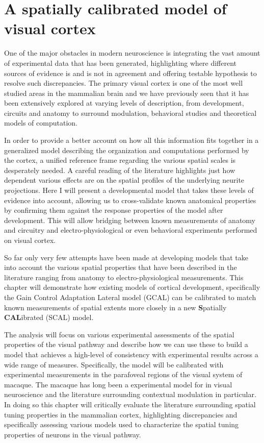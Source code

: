 \chapter{A spatially calibrated model of visual cortex}

One of the major obstacles in modern neuroscience is integrating the
vast amount of experimental data that has been generated, highlighting
where different sources of evidence is and is not in agreement and
offering testable hypothesis to resolve such discrepancies. The
primary visual cortex is one of the most well studied areas in the
mammalian brain and we have previously seen that it has been
extensively explored at varying levels of description, from
development, circuits and anatomy to surround modulation, behavioral
studies and theoretical models of computation.

In order to provide a better account on how all this information fits
together in a generalized model describing the organization and
computations performed by the cortex, a unified reference frame
regarding the various spatial scales is desperately needed. A careful
reading of the literature highlights just how dependent various
effects are on the spatial profiles of the underlying neurite
projections. Here I will present a developmental model that takes
these levels of evidence into account, allowing us to cross-validate
known anatomical properties by confirming them against the response
properties of the model after development. This will allow bridging
between known measurements of anatomy and circuitry and
electro-physiological or even behavioral experiments performed on
visual cortex.

So far only very few attempts have been made at developing models that
take into account the various spatial properties that have been
described in the literature ranging from anatomy to
electro-physiological measurements. This chapter will demonstrate how
existing models of cortical development, specifically the Gain Control
Adaptation Lateral model (GCAL) \citep{Stevens2013} can be calibrated
to match known measurements of spatial extents more closely in a new
\textbf{S}patially \textbf{CAL}ibrated (SCAL) model.

The analysis will focus on various experimental assessments of the
spatial properties of the visual pathway and describe how we can use
these to build a model that achieves a high-level of consistency with
experimental results across a wide range of measures. Specifically,
the model will be calibrated with experimental measurements in the
parafoveal regions of the visual system of macaque. The macaque has
long been a experimental model for in visual neuroscience and the
literature surrounding contextual modulation in particular. In doing
so this chapter will critically evaluate the literature surrounding
spatial tuning properties in the mammalian cortex, highlighting
discrepancies and specifically assessing various models used to
characterize the spatial tuning properties of neurons in the visual
pathway.

